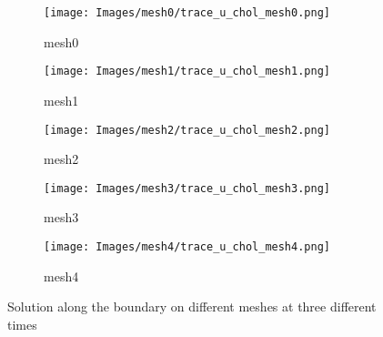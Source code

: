 \begin{figure}[htbp]
    \centering
    \begin{subfigure}{0.45\textwidth}
        \centering
        \texttt{[image: Images/mesh0/trace\_u\_chol\_mesh0.png]}
        \caption{mesh0}
    \end{subfigure}
    \hfill
    \begin{subfigure}{0.45\textwidth}
        \centering
        \texttt{[image: Images/mesh1/trace\_u\_chol\_mesh1.png]}
        \caption{mesh1}
    \end{subfigure}
    \hfill
    \begin{subfigure}{0.45\textwidth}
        \centering
        \texttt{[image: Images/mesh2/trace\_u\_chol\_mesh2.png]}
        \caption{mesh2}
    \end{subfigure}

    \vspace{1em} %

    \begin{subfigure}{0.45\textwidth}
        \centering
        \texttt{[image: Images/mesh3/trace\_u\_chol\_mesh3.png]}
        \caption{mesh3}
    \end{subfigure}
    \hfill
    \begin{subfigure}{0.45\textwidth}
        \centering
        \texttt{[image: Images/mesh4/trace\_u\_chol\_mesh4.png]}
        \caption{mesh4}
    \end{subfigure}

    \caption{Solution along the boundary on different meshes at three different times}
    \label{fig: boundary_solution}
\end{figure}

 

